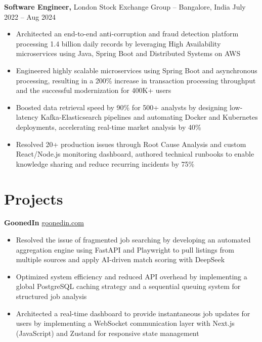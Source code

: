 \documentclass[11pt]{article}       %
\begin{document}
\textbf{Software Engineer,} {London Stock Exchange Group} -- Bangalore, India \hfill July 2022 -- Aug 2024 \\
\vspace{-9pt}
\begin{itemize}
    \item Architected an end-to-end anti-corruption and fraud detection platform processing 1.4 billion daily records by leveraging High Availability microservices using Java, Spring Boot and Distributed Systems on AWS
    \item Engineered highly scalable microservices using Spring Boot and asynchronous processing, resulting in a 200\% increase in transaction processing throughput and the successful modernization for 400K+ users
    \item Boosted data retrieval speed by 90\% for 500+ analysts by designing low-latency Kafka-Elasticsearch pipelines and automating Docker and Kubernetes deployments, accelerating real-time market analysis by 40\%
    \item Resolved 20+ production issues through Root Cause Analysis and custom React/Node.js monitoring dashboard, authored technical runbooks to enable knowledge sharing and reduce recurring incidents by 75\%
\end{itemize}

\vspace{-18.5pt}

\section*{Projects}
\textbf{GoonedIn} \hfill \href{https://goonedin.vercel.app/}{goonedin.com} \\
\vspace{-9pt}
\begin{itemize}
  \item Resolved the issue of fragmented job searching by developing an automated aggregation engine using FastAPI and Playwright to pull listings from multiple sources and apply AI-driven match scoring with DeepSeek
  \item Optimized system efficiency and reduced API overhead by implementing a global PostgreSQL caching strategy and a sequential queuing system for structured job analysis
  \item Architected a real-time dashboard to provide instantaneous job updates for users by implementing a WebSocket communication layer with Next.js (JavaScript) and Zustand for responsive state management
\end{itemize}
\end{document}
